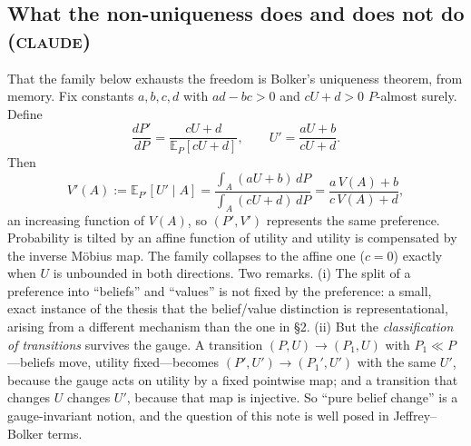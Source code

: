 \documentclass[11pt,a4paper]{article}
\newcommand{\E}{\mathbb{E}}
\newcommand{\CLAUDE}{\textnormal{\scshape claude}}
\begin{document}
\subsection{What the non-uniqueness does and does not do (\CLAUDE)}
That the family below exhausts the freedom is Bolker's uniqueness theorem, from memory. Fix constants $a, b, c, d$ with $ad - bc > 0$ and $cU + d > 0$ $P$-almost surely. Define
\[
\frac{dP'}{dP} = \frac{cU + d}{\E_P[cU + d]}, \qquad U' = \frac{aU + b}{cU + d}.
\]
Then
\[
V'(A) := \E_{P'}[U' \mid A] = \frac{\int_A (aU + b)\,dP}{\int_A (cU + d)\,dP} = \frac{a\,V(A) + b}{c\,V(A) + d},
\]
an increasing function of $V(A)$, so $(P', V')$ represents the same preference. Probability is tilted by an affine function of utility and utility is compensated by the inverse M\"obius map. The family collapses to the affine one ($c = 0$) exactly when $U$ is unbounded in both directions. Two remarks. (i) The split of a preference into ``beliefs'' and ``values'' is not fixed by the preference: a small, exact instance of the thesis that the belief/value distinction is representational, arising from a different mechanism than the one in \S2. (ii) But the \emph{classification of transitions} survives the gauge. A transition $(P, U) \to (P_1, U)$ with $P_1 \ll P$---beliefs move, utility fixed---becomes $(P', U') \to (P_1', U')$ with the same $U'$, because the gauge acts on utility by a fixed pointwise map; and a transition that changes $U$ changes $U'$, because that map is injective. So ``pure belief change'' is a gauge-invariant notion, and the question of this note is well posed in Jeffrey--Bolker terms.
\end{document}
